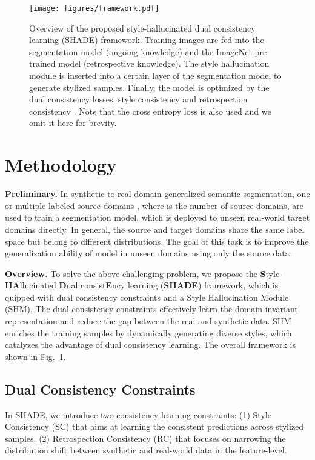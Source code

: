 \documentclass[runningheads]{llncs}
\newcommand{\ours}{SHADE\xspace}
\begin{document}
\begin{figure}[t]
    \centering
    \texttt{[image: figures/framework.pdf]}
\caption{Overview of the proposed style-hallucinated dual consistency learning (\ours) framework. Training images are fed into the segmentation model (ongoing knowledge) and the ImageNet pre-trained model (retrospective knowledge). 
    The style hallucination module is inserted into a certain layer of the segmentation model to generate stylized samples.
    Finally, the model is optimized by the dual consistency losses: style consistency  and retrospection consistency . Note that the cross entropy loss is also used and we omit it here for brevity.}
    \label{fig:framework}
\end{figure}

\section{Methodology}
\noindent\textbf{Preliminary.} In synthetic-to-real domain generalized semantic segmentation, one or multiple labeled source domains , where  is the number of source domains, are used to train a segmentation model, which is deployed to unseen real-world target domains  directly. 
In general, the source and target domains share the same label space  but belong to different distributions. The goal of this task is to improve the generalization ability of model in unseen domains using only the source data.

\begin{sloppypar}
\noindent\textbf{Overview.} 
To solve the above challenging problem, we propose the \textbf{S}tyle-\textbf{HA}llucinated \textbf{D}ual consist\textbf{E}ncy learning (\textbf{\ours}) framework, which is quipped with dual consistency constraints and a Style Hallucination Module (SHM). The dual consistency constraints effectively learn the domain-invariant representation and reduce the gap between the real and synthetic data. SHM enriches the training samples by dynamically generating diverse styles, which catalyzes the advantage of dual consistency learning. The overall framework is shown in Fig.~\ref{fig:framework}.
\end{sloppypar}

\subsection{Dual Consistency Constraints}
In \ours, we introduce two consistency learning constraints: (1) Style Consistency (SC) that aims at learning the consistent predictions across stylized samples. (2) Retrospection Consistency (RC) that focuses on narrowing the distribution shift between synthetic and real-world data in the feature-level.
\end{document}
